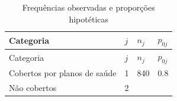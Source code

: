 \documentclass[]{book}
\theoremstyle{definition}
\theoremstyle{definition}
\theoremstyle{definition}
\theoremstyle{remark}
\begin{document}
\begin{longtable}[]{@{}llll@{}}
\caption{\label{tab:prophip} Frequências observadas e proporções
hipotéticas}\tabularnewline
\toprule
\begin{minipage}[b]{0.23\columnwidth}\raggedright\strut
Categoria\strut
\end{minipage} & \begin{minipage}[b]{0.05\columnwidth}\raggedright\strut
\(j\)\strut
\end{minipage} & \begin{minipage}[b]{0.07\columnwidth}\raggedright\strut
\(n_j\)\strut
\end{minipage} & \begin{minipage}[b]{0.11\columnwidth}\raggedright\strut
\(p_{0j}\)\strut
\end{minipage}\tabularnewline
\midrule
\endfirsthead
\toprule
\begin{minipage}[b]{0.23\columnwidth}\raggedright\strut
Categoria\strut
\end{minipage} & \begin{minipage}[b]{0.05\columnwidth}\raggedright\strut
\(j\)\strut
\end{minipage} & \begin{minipage}[b]{0.07\columnwidth}\raggedright\strut
\(n_j\)\strut
\end{minipage} & \begin{minipage}[b]{0.11\columnwidth}\raggedright\strut
\(p_{0j}\)\strut
\end{minipage}\tabularnewline
\midrule
\endhead
\begin{minipage}[t]{0.23\columnwidth}\raggedright\strut
Cobertos por planos de saúde\strut
\end{minipage} & \begin{minipage}[t]{0.05\columnwidth}\raggedright\strut
1\strut
\end{minipage} & \begin{minipage}[t]{0.07\columnwidth}\raggedright\strut
840\strut
\end{minipage} & \begin{minipage}[t]{0.11\columnwidth}\raggedright\strut
0.8\strut
\end{minipage}\tabularnewline
\begin{minipage}[t]{0.23\columnwidth}\raggedright\strut
Não cobertos\strut
\end{minipage} & \begin{minipage}[t]{0.05\columnwidth}\raggedright\strut
2\strut
\end{minipage} & \begin{minipage}[t]{0.07\columnwidth}\raggedright\strut

\end{minipage}
\end{longtable}
\end{document}
